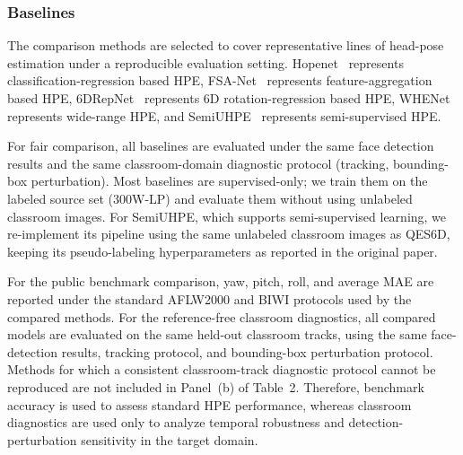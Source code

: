 \documentclass[preprint,12pt]{elsarticle}
\begin{document}
\subsubsection{Baselines}

The comparison methods are selected to cover representative lines of head-pose estimation under a reproducible evaluation setting. Hopenet~\cite{ruiz2018hopenet} represents classification-regression based HPE, FSA-Net~\cite{yang2019fsanet} represents feature-aggregation based HPE, 6DRepNet~\cite{hempel2022sixdrepnet} represents 6D rotation-regression based HPE, WHENet~\cite{zhou2020whenet} represents wide-range HPE, and SemiUHPE~\cite{zhou2026semiuhpe} represents semi-supervised HPE.

For fair comparison, all baselines are evaluated under the same face detection results and the same classroom-domain diagnostic protocol (tracking, bounding-box perturbation). Most baselines are supervised-only; we train them on the labeled source set (300W-LP) and evaluate them without using unlabeled classroom images. For SemiUHPE, which supports semi-supervised learning, we re-implement its pipeline using the same unlabeled classroom images as QES6D, keeping its pseudo-labeling hyperparameters as reported in the original paper. 

For the public benchmark comparison, yaw, pitch, roll, and average MAE are reported under the standard AFLW2000 and BIWI protocols used by the compared methods. For the reference-free classroom diagnostics, all compared models are evaluated on the same held-out classroom tracks, using the same face-detection results, tracking protocol, and bounding-box perturbation protocol. Methods for which a consistent classroom-track diagnostic protocol cannot be reproduced are not included in Panel~(b) of Table~2. Therefore, benchmark accuracy is used to assess standard HPE performance, whereas classroom diagnostics are used only to analyze temporal robustness and detection-perturbation sensitivity in the target domain.
\end{document}
